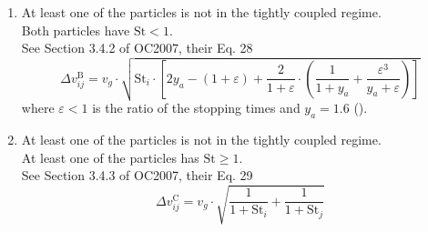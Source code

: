 \begin{enumerate}
            \item At least one of the particles is not in the tightly coupled regime. \\
                Both particles have $\text{St} < 1$. \\
                See Section 3.4.2 of OC2007, their Eq. 28
                \begin{equation}
                    \Delta v_{ij}^\text{B} = v_g \cdot \sqrt{
                        \text{St}_i \cdot \left[
                            2y_a - (1+\varepsilon) + \frac{2}{1+\varepsilon} \cdot \left(
                                \frac{1}{1+y_a} + \frac{\varepsilon^3}{y_a+\varepsilon}
                            \right)
                        \right] 
                    }
                \end{equation}
                where $\varepsilon < 1$ is the ratio of the stopping times 
                and $y_a = 1.6$ ().

            \item At least one of the particles is not in the tightly coupled regime. \\ 
                At least one of the particles has $\text{St} \geq 1$. \\
                See Section 3.4.3 of OC2007, their Eq. 29
                \begin{equation}
                    \Delta v_{ij}^\text{C} = v_g \cdot \sqrt{
                        \frac{1}{1+\text{St}_i} + \frac{1}{1+\text{St}_j}
                    }
                \end{equation}

        \end{enumerate}

